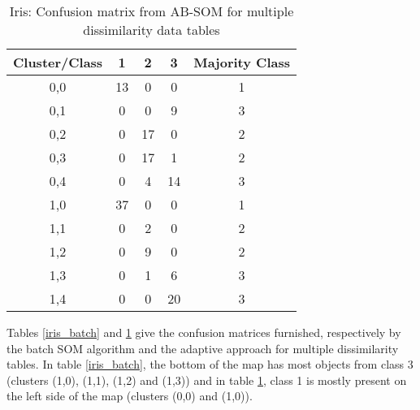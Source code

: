 \documentclass[10pt, conference, compsocconf]{IEEEtran}
\begin{document}
\begin{table}[!h]
\renewcommand{\arraystretch}{1.0}
\begin{center}
\caption{Iris: Confusion matrix from AB-SOM for multiple dissimilarity data tables}
\begin{tabular}{|c|c|c|c||c|}
\hline
Cluster/Class & 1 & 2 & 3 & Majority Class\\ \hline
0,0 & 13 & 0 & 0 & 1\\ \hline
0,1 & 0 & 0 & 9 & 3\\ \hline
0,2 & 0 & 17 & 0 & 2\\ \hline
0,3 & 0 & 17 & 1 & 2\\ \hline
0,4 & 0 & 4 & 14 & 3\\ \hline \hline
1,0 & 37 & 0 & 0 & 1\\ \hline
1,1 & 0 & 2 & 0 & 2\\ \hline
1,2 & 0 & 9 & 0 & 2\\ \hline
1,3 & 0 & 1 & 6 & 3\\ \hline
1,4 & 0 & 0 & 20 & 3\\ \hline

\end{tabular}
\label{iris_adaptativo}
\end{center}
\end{table}

Tables \ref{iris_batch} and \ref{iris_adaptativo} give the confusion matrices furnished, respectively by the batch SOM algorithm and the adaptive approach for multiple dissimilarity tables. In table \ref{iris_batch}, the bottom of the map has most objects from class 3 (clusters (1,0), (1,1), (1,2) and (1,3)) and in table \ref{iris_adaptativo}, class 1 is mostly present on the left side of the map (clusters (0,0) and (1,0)).
\end{document}
